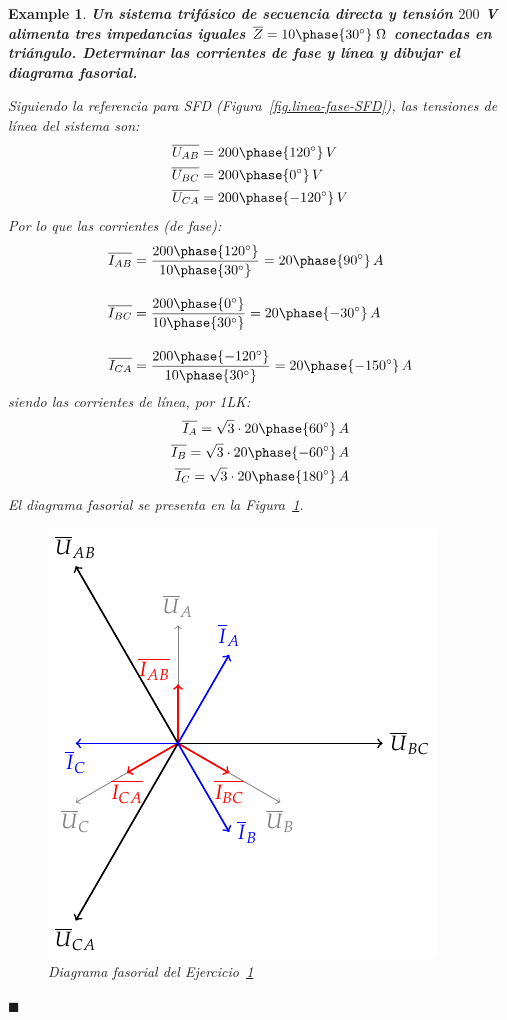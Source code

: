 \documentclass[11pt]{book} %
\numberwithin{dummy}{section}
\theoremstyle{ocrenumbox}
\theoremstyle{blacknumex}
\newtheorem{exampleT}{Example}[chapter]
\theoremstyle{blacknumbox}
\theoremstyle{ocrenum}
\newenvironment{example}{\begin{exampleT}}{\hfill{\tiny\ensuremath{\blacksquare}}\end{exampleT}}
\begin{document}
	\vspace{4mm}
    \begin{example}\label{ej.3-2}
	    \textbf{Un sistema trifásico de secuencia directa y tensión $200$ V alimenta tres impedancias iguales $\overline{Z}=10\phase{30^\circ}\;\Omega$ conectadas en triángulo. Determinar las corrientes de fase y línea y dibujar el diagrama fasorial.}
	    
	    Siguiendo la referencia para SFD (Figura~\ref{fig.linea-fase-SFD}), las tensiones de línea del sistema son:
	    \begin{align*}
	        \overline{U_{AB}}&=200\phase{120^\circ}\,V\\
	        \overline{U_{BC}}&=200\phase{0^\circ}\,V\\
	        \overline{U_{CA}}&=200\phase{-120^\circ}\,V
	    \end{align*}
	    Por lo que las corrientes (de fase):
	    \begin{align*}
	        \overline{I_{AB}} &= \frac{200\phase{120^\circ}}{10\phase{30^\circ}} =20\phase{90^\circ} \,A \\[10pt]
          \overline{I_{BC}} &= \frac{200\phase{0^\circ}}{10\phase{30^\circ}} = 20\phase{-30^\circ} \,A\\[10pt]
          \overline{I_{CA}} &=\frac{200\phase{-120^\circ}}{10\phase{30^\circ}} = 20\phase{-150^\circ} \,A
	    \end{align*}
	    siendo las corrientes de línea, por 1LK:
	    \begin{align*}
	        \overline{I_A}=\sqrt{3}\cdot 20\phase{60^\circ}\,A\\
	        \overline{I_B}=\sqrt{3}\cdot 20\phase{-60^\circ}\,A\\
	        \overline{I_C}=\sqrt{3}\cdot 20\phase{180^\circ}\,A
	    \end{align*}
	    El diagrama fasorial se presenta en la Figura~\ref{fig.diagrama_ejemplo_3-2}. 
	    \begin{figure}[htbp]
	        \centering
	    \includegraphics[width=0.4\linewidth]{../figs/diagrama_ejemplo3_2.pdf}
	        \caption{Diagrama fasorial del Ejercicio~\ref{ej.3-2}}
	        \label{fig.diagrama_ejemplo_3-2}
	    \end{figure}
	\end{example}
	
\end{document}
